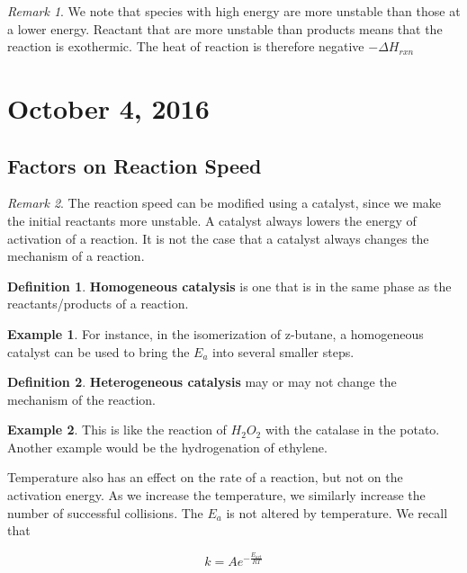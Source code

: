 \documentclass[11pt]{article}
\theoremstyle{plain} %
\theoremstyle{definition}
\newtheorem*{definition}{Definition} %
\theoremstyle{example}
\newtheorem*{example}{Example}
\theoremstyle{remark}
\newtheorem*{remark}{Remark}
\begin{document}
\begin{remark}
We note that species with high energy are more unstable than those at a lower energy. Reactant that are more unstable than products means that the reaction is exothermic. The heat of reaction is therefore negative $-\Delta H_{rxn} $
\end{remark}



\section{October 4, 2016}
\subsection{Factors on Reaction Speed}

\begin{remark}
The reaction speed can be modified using a catalyst, since we make the initial reactants more unstable. A catalyst always lowers the energy of activation of a reaction. It is not the case that a catalyst always changes the mechanism of a reaction. 
\end{remark}

\begin{definition}
\textbf{Homogeneous catalysis} is one that is in the same phase as the reactants/products of a reaction. 
\end{definition}


\begin{example}
For instance, in the isomerization of z-butane, a homogeneous catalyst can be used to bring the $E_a$ into several smaller steps. 
\end{example}

\begin{definition}
\textbf{Heterogeneous catalysis} may or may not change the mechanism of the reaction. 
\end{definition}

\begin{example}
This is like the reaction of $H_2O_2$ with the catalase in the potato. Another example would be the hydrogenation of ethylene. 
\end{example}

Temperature also has an effect on the rate of a reaction, but not on the activation energy. As we increase the temperature, we similarly increase the number of successful collisions. The $E_a$ is not altered by temperature. We recall that 

$$k = Ae^{-\frac{E_{act}}{RT}}$$
\end{document}
